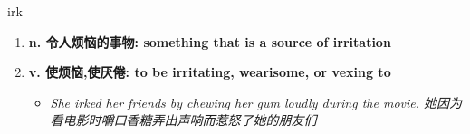 
\begin{frame}
{\huge irk}
\begin{center}
\begin{enumerate}\Large
  \item \textbf{n. 令人烦恼的事物: something that is a source of irritation}
  \item \textbf{v. 使烦恼,使厌倦: to be irritating, wearisome, or vexing to}
  \begin{itemize}
    \item \em{\Large{She irked her friends by chewing her gum loudly during the movie. 她因为看电影时嚼口香糖弄出声响而惹怒了她的朋友们}}
  \end{itemize}
\end{enumerate}
\end{center}
\end{frame}
